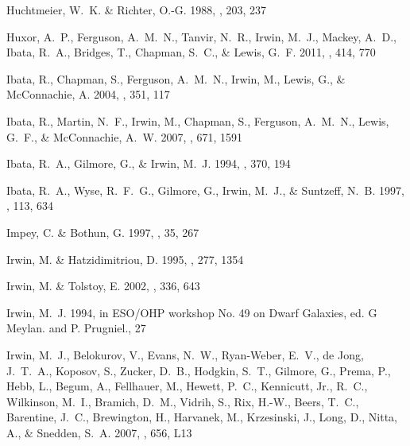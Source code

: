 \documentclass[manuscript]{aastex}
\begin{document}
\begin{thebibliography}{381}
{Huchtmeier}, W.~K. \& {Richter}, O.-G. 1988, \aap, 203, 237

{Huxor}, A.~P., {Ferguson}, A.~M.~N., {Tanvir}, N.~R., {Irwin}, M.~J.,
  {Mackey}, A.~D., {Ibata}, R.~A., {Bridges}, T., {Chapman}, S.~C., \& {Lewis},
  G.~F. 2011, \mnras, 414, 770

{Ibata}, R., {Chapman}, S., {Ferguson}, A.~M.~N., {Irwin}, M., {Lewis}, G., \&
  {McConnachie}, A. 2004, \mnras, 351, 117

{Ibata}, R., {Martin}, N.~F., {Irwin}, M., {Chapman}, S., {Ferguson}, A.~M.~N.,
  {Lewis}, G.~F., \& {McConnachie}, A.~W. 2007, \apj, 671, 1591

{Ibata}, R.~A., {Gilmore}, G., \& {Irwin}, M.~J. 1994, \nat, 370, 194

{Ibata}, R.~A., {Wyse}, R.~F.~G., {Gilmore}, G., {Irwin}, M.~J., \& {Suntzeff},
  N.~B. 1997, \aj, 113, 634

{Impey}, C. \& {Bothun}, G. 1997, \araa, 35, 267

{Irwin}, M. \& {Hatzidimitriou}, D. 1995, \mnras, 277, 1354

{Irwin}, M. \& {Tolstoy}, E. 2002, \mnras, 336, 643

{Irwin}, M.~J. 1994, in ESO/OHP workshop No. 49 on Dwarf Galaxies, ed. G
  Meylan. and P. Prugniel., 27

{Irwin}, M.~J., {Belokurov}, V., {Evans}, N.~W., {Ryan-Weber}, E.~V., {de
  Jong}, J.~T.~A., {Koposov}, S., {Zucker}, D.~B., {Hodgkin}, S.~T., {Gilmore},
  G., {Prema}, P., {Hebb}, L., {Begum}, A., {Fellhauer}, M., {Hewett}, P.~C.,
  {Kennicutt}, Jr., R.~C., {Wilkinson}, M.~I., {Bramich}, D.~M., {Vidrih}, S.,
  {Rix}, H.-W., {Beers}, T.~C., {Barentine}, J.~C., {Brewington}, H.,
  {Harvanek}, M., {Krzesinski}, J., {Long}, D., {Nitta}, A., \& {Snedden},
  S.~A. 2007, \apjl, 656, L13


\end{thebibliography}
\end{document}
